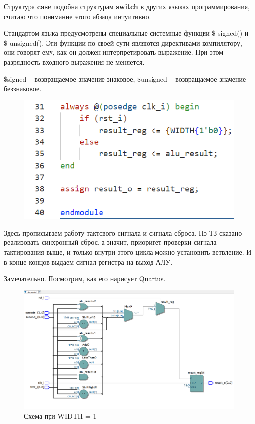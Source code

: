 \documentclass[a4paper,12pt]{article} %
\begin{document}
Структура \textbf{case} подобна структурам \textbf{switch} в других языках программирования, считаю что понимание этого абзаца интуитивно.

Стандартом языка предусмотрены специальные системные функции $\$$ signed() и $\$$ unsigned(). Эти функции по своей сути являются директивами компилятору, они говорят ему, как он должен интерпретировать выражение. При этом разрядность входного выражения не меняется.

$\$$signed – возвращаемое значение знаковое, $\$$unsigned – возвращаемое значение беззнаковое.

\begin{figure}[H]
    \centering
    \includegraphics[width=0.5\linewidth]{Final/end.png}
\end{figure}

Здесь прописываем работу тактового сигнала и сигнала сброса. По ТЗ сказано реализовать синхронный сброс, а значит, приоритет проверки сигнала тактирования выше, и только внутри этого цикла  можно установить ветвление. И в конце концов выдаем сигнал регистра на выход АЛУ.

Замечательно. Посмотрим, как его нарисует Quartus.

\begin{figure}[H]
    \centering
    \includegraphics[width=1\linewidth]{Final/Quartus_alu.png}
    \caption{Схема при WIDTH = 1}
\end{figure}
\end{document}

